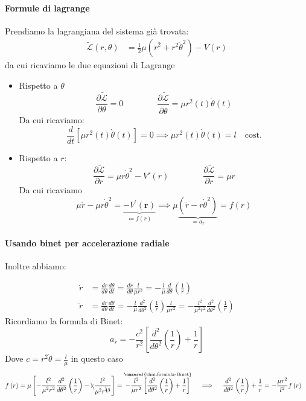 \documentclass[a4paper,10pt]{article}
\theoremstyle{definition}
\theoremstyle{indentdefinition}
\theoremstyle{indenttheorem}
\theoremstyle{myremark}
\theoremstyle{indentgeneral}
\begin{document}
\paragraph{Formule di lagrange} Prendiamo la lagrangiana del sistema già trovata:
\begin{align*}
\widetilde{\mathcal{L}}(r,\theta) & =\frac{1}{2}\mu\left(\dot{r}^{2}+r^{2}\dot{\theta}^{2}\right)-V\left(r\right)
\end{align*}
da cui ricaviamo le due equazioni di Lagrange
\begin{itemize}
    \item Rispetto a $\theta$  
    $$ \frac{\partial \widetilde{\mathcal{L}}}{\partial\theta}=0 \qquad\qquad \frac{\partial\widetilde{\mathcal{L}}}{\partial\dot{\theta}}=\mu {{r^{2}(t)\dot{\theta}(t)}}$$
    Da cui ricaviamo: $$\frac{d}{dt}\left[\mu {{r^{2}(t)\dot{\theta}(t)}}\right]=0\implies \boxed{\mu {{r^{2}(t)\dot{\theta}(t)}}=l \quad \text{cost.}}$$
    \item Rispetto a $r$:
     $$ \frac{\partial \widetilde{\mathcal{L}}}{\partial  r}=\mu r \dot{\theta}^2-V'(r) \qquad\qquad \frac{\partial\widetilde{\mathcal{L}}}{\partial\dot{r}}=\mu\dot{r}$$
     Da cui ricaviamo
    $$\mu\ddot{r}-\mu r\dot{\theta}^{2}=\underbrace{-V^{\prime}\left(\boldsymbol{r}\right)}_{\coloneqq f(r)}\implies\boxed{\mu\underbrace{(\ddot{r}- r\dot{\theta}^{2})}_{=a_r}=f(r)}$$
\end{itemize} 
\paragraph{Usando binet per accelerazione radiale} Inoltre abbiamo:

\begin{align*}
\dot{r} &=\frac{dr}{d\theta}\frac{d\theta}{dt}=\frac{dr}{d\theta}\frac{l}{\mu r^{2}}=-\frac{l}{\mu}\frac{d}{d\theta}\left(\frac{1}{r}\right) \\
\ddot{r} &=\frac{d\dot{r}}{d\theta}\frac{d\theta}{dt}=-\frac{l}{\mu}\frac{d^{2}}{d\theta^{2}}\left(\frac{1}{r}\right)\frac{l}{\mu r^{2}}=-\frac{l^{2}}{\mu^{2}r^{2}}\frac{d^{2}}{d\theta^{2}}\left(\frac{1}{r}\right)
\end{align*}
Ricordiamo la formula di Binet:
\[
a_{r}=-\frac{c^{2}}{r^{2}}\left[\frac{d^{2}}{d\theta^{2}}\left(\frac{1}{r}\right)+\frac{1}{r}\right]
\]
Dove $c=r^2\dot{\theta}=\frac{l}{\mu}$ in questo caso
\begin{align*}
f\left(r\right) & =\mu\left[-\frac{l^{2}}{\mu^{2}r^{2}}\frac{d^{2}}{d\theta^{2}}\left(\frac{1}{r}\right)-\bcancel{r}\frac{l^{2}}{\mu^{2}r^{\bcancel{4}3}}\right]=\overset{\text{\nameref{thm:formula-Binet}}}{-\frac{l^{2}}{\mu r^{2}}\left[\frac{d^{2}}{d\theta^{2}}\left(\frac{1}{r}\right)+\frac{1}{r}\right]} \quad\implies\quad\frac{d^{2}}{d\theta^{2}}\left(\frac{1}{r}\right)+\frac{1}{r}  =-\frac{\mu r^{2}}{l^{2}}f\left(r\right)
\end{align*}
\end{document}
